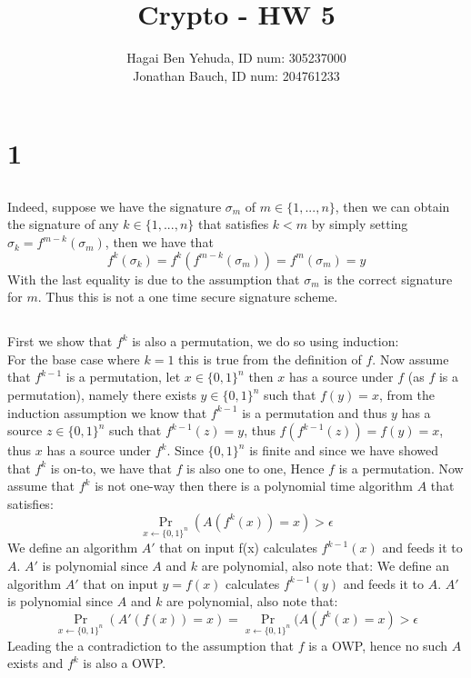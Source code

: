 \documentclass{article}
\title{Crypto - HW 5}
\author{Hagai Ben Yehuda, ID num: 305237000\\ Jonathan Bauch, ID num: 204761233}
\date{}
\begin{document}
  \maketitle

\section{1}
\subsection{}%
Indeed, suppose we have the signature $\sigma_m$ of $m\in\{1,..., n\}$, then we can obtain the signature of any $k \in\{1,...,n\}$ that satisfies $k < m$ by simply setting $\sigma_k = f^{m-k}(\sigma_m)$, then we have that 
\[f^{k}(\sigma_k) = f^{k}(f^{m-k}(\sigma_m)) = f^{m}(\sigma_m) = y\]
With the last equality is due to the assumption that $\sigma_m$ is the correct signature for $m$.
Thus this is not a one time secure signature scheme.

\subsection{}%
First we show that $f^k$ is also a permutation, we do so using induction:\\
For the base case where $k = 1$ this is true from the definition of $f$.
Now assume that $f^{k-1}$ is a permutation, let $x\in\{0,1\}^n$ then $x$ has a source under $f$ (as $f$ is a permutation), namely there exists $y\in\{0,1\}^n$ such that $f(y) = x$, from the induction assumption we know that $f^{k-1}$ is a permutation and thus $y$ has a source $z\in\{0,1\}^n$ such that $f^{k-1}(z) = y$, thus $f(f^{k-1}(z)) = f(y) = x$, thus $x$ has a source under $f^k$.
Since $\{0,1\}^n$ is finite and since we have showed that $f^k$ is on-to, we have that $f$ is also one to one, Hence $f$ is a permutation.
Now assume that $f^k$ is not  one-way then there is a polynomial time algorithm $A$ that satisfies: 
\[\Pr_{x\leftarrow \{0,1\}^n}(A(f^k(x)) = x) > \epsilon\]
We define an algorithm $A'$ that on input f(x) calculates $f^{k-1}(x)$ and feeds it to $A$. $A'$ is polynomial since $A$ and $k$ are polynomial, also note that:
We define an algorithm $A'$ that on input $y=f(x)$ calculates $f^{k-1}(y)$ and feeds it to $A$. $A'$ is polynomial since $A$ and $k$ are polynomial, also note that:
\[\Pr_{x\leftarrow \{0,1\}^n}(A'(f(x)) = x) = \Pr_{x\leftarrow \{0,1\}^n}(A(f^k(x) = x) > \epsilon\]
Leading the a contradiction to the assumption that $f$ is a OWP, hence no such $A$ exists and $f^k$ is also a OWP.
\end{document}
